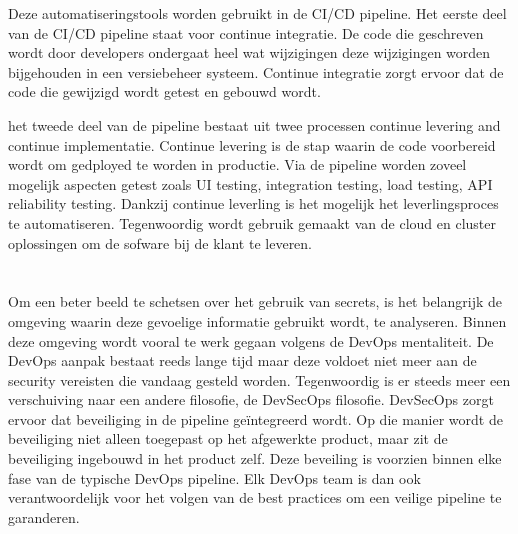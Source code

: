 Deze automatiseringstools worden gebruikt in de CI/CD pipeline. Het eerste deel van de CI/CD pipeline staat voor continue integratie. De code die geschreven wordt door developers ondergaat heel wat wijzigingen deze wijzigingen worden bijgehouden in een versiebeheer systeem. Continue integratie zorgt ervoor dat de code die gewijzigd wordt getest en gebouwd wordt.
\newline

het tweede deel van de pipeline bestaat uit twee processen continue levering and continue implementatie. Continue levering is de stap waarin de code voorbereid wordt om gedployed te worden in productie. Via de pipeline worden zoveel mogelijk aspecten getest zoals UI testing, integration testing, load testing, API reliability testing. Dankzij continue leverling is het mogelijk het leverlingsproces te automatiseren. Tegenwoordig wordt gebruik gemaakt van de cloud en cluster oplossingen om de sofware bij de klant te leveren.

\section{}
\label{sec:DevSecOps binnen de pipeline}

\subsection{}
\label{sec:DevSecOps impact op de pipeline}
Om een beter beeld te schetsen over het gebruik van secrets, is het belangrijk de omgeving waarin deze gevoelige informatie gebruikt wordt, te analyseren. Binnen deze omgeving wordt vooral te werk gegaan volgens de DevOps mentaliteit. De DevOps aanpak bestaat reeds lange tijd maar deze voldoet niet meer aan de security vereisten die vandaag gesteld worden. Tegenwoordig is er steeds meer een verschuiving naar een andere filosofie, de DevSecOps filosofie. DevSecOps zorgt ervoor dat beveiliging in de pipeline geïntegreerd wordt. Op die manier wordt de beveiliging niet alleen toegepast op het afgewerkte product, maar zit de beveiliging ingebouwd in het product zelf. Deze beveiling is voorzien binnen elke fase van de typische DevOps pipeline. Elk DevOps team is dan ook verantwoordelijk voor het volgen van de best practices om een veilige pipeline te garanderen.\autocite{Zettler2020}
\newline

